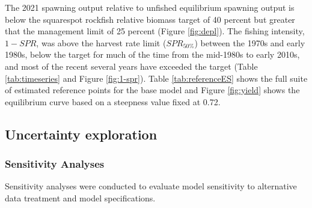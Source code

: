 \documentclass[11pt,
  english,
  a4paper,
]{article}
\begin{document}
\leavevmode\tagmcend\tagstructend\par


The 2021 spawning output relative to unfished equilibrium spawning output is below the squarespot rockfish relative biomass target of 40 percent but greater that the management limit of 25 percent (Figure \ref{fig:depl}). The fishing intensity, {\(1-SPR\)\leavevmode\tagmcend\tagstructend}, was above the harvest rate limit ({\(SPR_{50\%}\)\leavevmode\tagmcend\tagstructend}) between the 1970s and early 1980s, below the target for much of the time from the mid-1980s to early 2010s, and most of the recent several years have exceeded the target (Table \ref{tab:timeseries} and Figure \ref{fig:1-spr}). Table \ref{tab:referenceES} shows the full suite of estimated reference points for the base model and Figure \ref{fig:yield} shows the equilibrium curve based on a steepness value fixed at 0.72.

\leavevmode\tagmcend\tagstructend\par


\hypertarget{uncertainty-exploration}{%
\subsection{Uncertainty exploration}\label{uncertainty-exploration}}

\leavevmode\tagmcend\tagstructend


\hypertarget{sensitivity-analyses}{%
\subsubsection{Sensitivity Analyses}\label{sensitivity-analyses}}

\leavevmode\tagmcend\tagstructend


Sensitivity analyses were conducted to evaluate model sensitivity to alternative data treatment and model specifications.

\leavevmode\tagmcend\tagstructend\par

\end{document}
